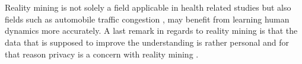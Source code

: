 \\\\
Reality mining is not solely a field applicable in health related studies but also fields such as automobile traffic congestion \parencite{pentland2009reality_mining_mobile_communication_gps}, may benefit from learning human dynamics more accurately. A last remark in regards to reality mining is that the data that is supposed to improve the understanding is rather personal and for that reason privacy is a concern with reality mining \parencite{madan2009_reality_mining_privacy}.
